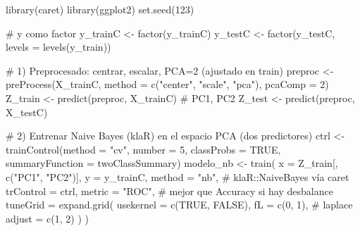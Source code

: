\documentclass[
  letterpaper,
  DIV=11,
  numbers=noendperiod]{scrartcl}
\newenvironment{Shaded}{\begin{snugshade}}{\end{snugshade}}
\newcommand{\AttributeTok}[1]{\textcolor[rgb]{0.40,0.45,0.13}{#1}}
\newcommand{\CommentTok}[1]{\textcolor[rgb]{0.37,0.37,0.37}{#1}}
\newcommand{\ConstantTok}[1]{\textcolor[rgb]{0.56,0.35,0.01}{#1}}
\newcommand{\DecValTok}[1]{\textcolor[rgb]{0.68,0.00,0.00}{#1}}
\newcommand{\FunctionTok}[1]{\textcolor[rgb]{0.28,0.35,0.67}{#1}}
\newcommand{\NormalTok}[1]{\textcolor[rgb]{0.00,0.23,0.31}{#1}}
\newcommand{\OtherTok}[1]{\textcolor[rgb]{0.00,0.23,0.31}{#1}}
\newcommand{\StringTok}[1]{\textcolor[rgb]{0.13,0.47,0.30}{#1}}
\begin{document}
\begin{Shaded}
\begin{Highlighting}[]
\FunctionTok{library}\NormalTok{(caret)}
\FunctionTok{library}\NormalTok{(ggplot2)}
\FunctionTok{set.seed}\NormalTok{(}\DecValTok{123}\NormalTok{)}

\CommentTok{\# y como factor}
\NormalTok{y\_trainC }\OtherTok{\textless{}{-}} \FunctionTok{factor}\NormalTok{(y\_trainC)}
\NormalTok{y\_testC  }\OtherTok{\textless{}{-}} \FunctionTok{factor}\NormalTok{(y\_testC, }\AttributeTok{levels =} \FunctionTok{levels}\NormalTok{(y\_train))}

\CommentTok{\# 1) Preprocesado: centrar, escalar, PCA=2 (ajustado en train)}
\NormalTok{preproc }\OtherTok{\textless{}{-}} \FunctionTok{preProcess}\NormalTok{(X\_trainC, }\AttributeTok{method =} \FunctionTok{c}\NormalTok{(}\StringTok{"center"}\NormalTok{, }\StringTok{"scale"}\NormalTok{, }\StringTok{"pca"}\NormalTok{), }\AttributeTok{pcaComp =} \DecValTok{2}\NormalTok{)}
\NormalTok{Z\_train }\OtherTok{\textless{}{-}} \FunctionTok{predict}\NormalTok{(preproc, X\_trainC)  }\CommentTok{\# PC1, PC2}
\NormalTok{Z\_test  }\OtherTok{\textless{}{-}} \FunctionTok{predict}\NormalTok{(preproc, X\_testC)}

\CommentTok{\# 2) Entrenar Naive Bayes (klaR) en el espacio PCA (dos predictores)}
\NormalTok{ctrl }\OtherTok{\textless{}{-}} \FunctionTok{trainControl}\NormalTok{(}\AttributeTok{method =} \StringTok{"cv"}\NormalTok{, }\AttributeTok{number =} \DecValTok{5}\NormalTok{, }\AttributeTok{classProbs =} \ConstantTok{TRUE}\NormalTok{,}
                     \AttributeTok{summaryFunction =}\NormalTok{ twoClassSummary)}
\NormalTok{modelo\_nb }\OtherTok{\textless{}{-}} \FunctionTok{train}\NormalTok{(}
  \AttributeTok{x =}\NormalTok{ Z\_train[, }\FunctionTok{c}\NormalTok{(}\StringTok{"PC1"}\NormalTok{, }\StringTok{"PC2"}\NormalTok{)], }\AttributeTok{y =}\NormalTok{ y\_trainC,}
  \AttributeTok{method =} \StringTok{"nb"}\NormalTok{,                 }\CommentTok{\# klaR::NaiveBayes vía caret}
  \AttributeTok{trControl =}\NormalTok{ ctrl,}
  \AttributeTok{metric =} \StringTok{"ROC"}\NormalTok{,                }\CommentTok{\# mejor que Accuracy si hay desbalance}
  \AttributeTok{tuneGrid =} \FunctionTok{expand.grid}\NormalTok{(}
    \AttributeTok{usekernel =} \FunctionTok{c}\NormalTok{(}\ConstantTok{TRUE}\NormalTok{, }\ConstantTok{FALSE}\NormalTok{),}
    \AttributeTok{fL =} \FunctionTok{c}\NormalTok{(}\DecValTok{0}\NormalTok{, }\DecValTok{1}\NormalTok{),                }\CommentTok{\# laplace}
    \AttributeTok{adjust =} \FunctionTok{c}\NormalTok{(}\DecValTok{1}\NormalTok{, }\DecValTok{2}\NormalTok{)}
\NormalTok{  )}
\NormalTok{)}


\end{Highlighting}
\end{Shaded}
\end{document}
